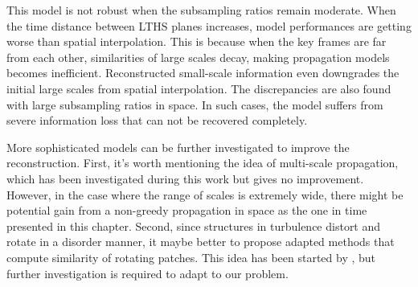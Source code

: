 This model is not robust when the subsampling ratios remain moderate. When the time distance between LTHS planes increases, model performances are getting worse than spatial interpolation. This is because when the key frames are far from each other, similarities of large scales decay, making propagation models becomes inefficient. Reconstructed small-scale information even downgrades the initial large scales from spatial interpolation. The discrepancies are also found with large subsampling ratios in space. In such cases, the model suffers from severe information loss that can not be recovered completely. 

More sophisticated models can be further investigated to improve the reconstruction. First, it's worth mentioning the idea of multi-scale propagation, which has been investigated during this work but gives no improvement. However, in the case where the range of scales is extremely wide, there might be potential gain from a non-greedy propagation in space as the one in time presented in this chapter. Second, since structures in turbulence distort and rotate in a disorder manner, it maybe better to propose adapted methods that compute similarity of rotating patches. This idea has been started by \citet{zimmer2008rotationally}, but further investigation is required to adapt to our problem.


